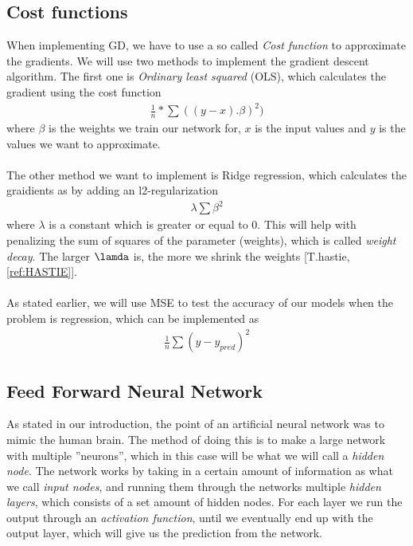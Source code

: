 \documentclass[english,notitlepage,reprint,nofootinbib]{revtex4-1}  %
\begin{document}
\subsection{Cost functions}
When implementing GD, we have to use a so called \textit{Cost function} to approximate the gradients. We will use two methods to implement the gradient descent algorithm. The first one is \textit{Ordinary least squared} (OLS), which calculates the gradient using the cost function
\begin{align*}
    \frac{1}{n}*\sum ((y-x).\beta)^2)
\end{align*}
where $\beta$ is the weights we train our network for, $x$ is the input values and $y$ is the values we want to approximate. 
\\
\\
The other method we want to implement is Ridge regression, which calculates the graidients as by adding an l2-regularization
\begin{align*}
    \lambda \sum \beta^2
\end{align*}
where $\lambda$ is a constant which is greater or equal to $0$. This will help with penalizing the sum of squares of the parameter (weights), which is called \textit{weight decay}. The larger $\lamda$ is, the more we shrink the weights [T.hastie, \ref{ref:HASTIE}].
\\
\\
As stated earlier, we will use MSE to test the accuracy of our models when the problem is regression, which can be implemented as
\begin{align*}
    \frac{1}{n}\sum (y - y_{pred})^2
\end{align*}

\subsection{Feed Forward Neural Network}
As stated in our introduction, the point of an artificial neural network was to mimic the human brain. The method of doing this is to make a large network with multiple ''neurons'', which in this case will be what we will call a \textit{hidden node}. The network works by taking in a certain amount of information as what we call \textit{input nodes}, and running them through the networks multiple \textit{hidden layers}, which consists of a set amount of hidden nodes. For each layer we run the output through an \textit{activation function}, until we eventually end up with the output layer, which will give us the prediction from the network.
\end{document}
